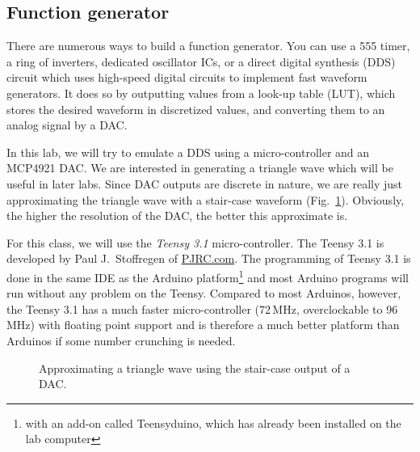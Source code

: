 \documentclass[letterpaper, 11pt]{article}
\begin{document}
\subsection{Function generator}

There are numerous ways to build a function generator. You can use a 555 timer, a ring of inverters, dedicated oscillator ICs, or a direct digital synthesis (DDS) circuit which uses high-speed digital circuits to implement fast waveform generators. It does so by outputting values from a look-up table (LUT), which stores the desired waveform in discretized values, and converting them to an analog signal by a DAC. 

In this lab, we will try to emulate a DDS using a micro-controller and an MCP4921 DAC. We are interested in generating a triangle wave which will be useful in later labs. Since DAC outputs are discrete in nature, we are really just approximating the triangle wave with a stair-case waveform (Fig.~\ref{fig:tri_dac}). Obviously, the higher the resolution of the DAC, the better this approximate is. 

For this class, we will use the \textit{Teensy 3.1} micro-controller. The Teensy 3.1 is developed by Paul J.~Stoffregen of \href{https://www.pjrc.com}{PJRC.com}. The programming of Teensy 3.1 is done in the same IDE as the Arduino platform\footnote{with an add-on called Teensyduino, which has already been installed on the lab computer} and most Arduino programs will run without any problem on the Teensy. Compared to most Arduinos, however, the Teensy 3.1 has a much faster micro-controller (72\,MHz, overclockable to 96\,MHz) with floating point support and is therefore a much better platform than Arduinos if some number crunching is needed. 

\begin{figure}[h]
	\caption{Approximating a triangle wave using the stair-case output of a DAC.}
	\label{fig:tri_dac}
\end{figure}
\end{document}
